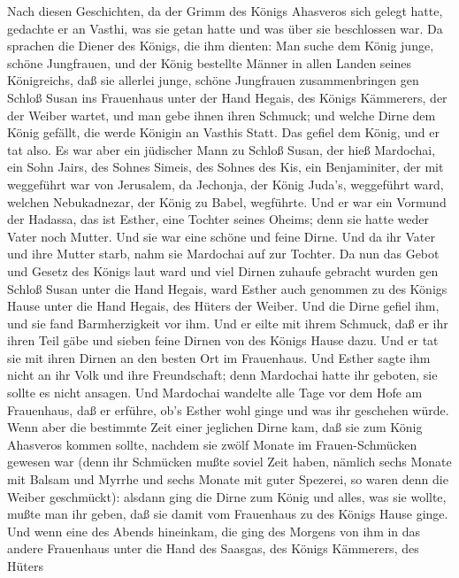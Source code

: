  Nach diesen Geschichten, da der Grimm des Königs Ahasveros
sich gelegt hatte, gedachte er an Vasthi, was sie getan hatte und was
über sie beschlossen war.  Da sprachen die Diener des
Königs, die ihm dienten: Man suche dem König junge, schöne Jungfrauen,
 und der König bestellte Männer in allen Landen seines
Königreichs, daß sie allerlei junge, schöne Jungfrauen zusammenbringen
gen Schloß Susan ins Frauenhaus unter der Hand Hegais, des Königs
Kämmerers, der der Weiber wartet, und man gebe ihnen ihren Schmuck;
 und welche Dirne dem König gefällt, die werde Königin an
Vasthis Statt. Das gefiel dem König, und er tat also.  Es
war aber ein jüdischer Mann zu Schloß Susan, der hieß Mardochai, ein
Sohn Jairs, des Sohnes Simeis, des Sohnes des Kis, ein Benjaminiter,
 der mit weggeführt war von Jerusalem, da Jechonja, der
König Juda's, weggeführt ward, welchen Nebukadnezar, der König zu Babel,
wegführte.  Und er war ein Vormund der Hadassa, das ist
Esther, eine Tochter seines Oheims; denn sie hatte weder Vater noch
Mutter. Und sie war eine schöne und feine Dirne. Und da ihr Vater und
ihre Mutter starb, nahm sie Mardochai auf zur Tochter.  Da
nun das Gebot und Gesetz des Königs laut ward und viel Dirnen zuhaufe
gebracht wurden gen Schloß Susan unter die Hand Hegais, ward Esther auch
genommen zu des Königs Hause unter die Hand Hegais, des Hüters der
Weiber.  Und die Dirne gefiel ihm, und sie fand
Barmherzigkeit vor ihm. Und er eilte mit ihrem Schmuck, daß er ihr ihren
Teil gäbe und sieben feine Dirnen von des Königs Hause dazu. Und er tat
sie mit ihren Dirnen an den besten Ort im Frauenhaus.  Und
Esther sagte ihm nicht an ihr Volk und ihre Freundschaft; denn Mardochai
hatte ihr geboten, sie sollte es nicht ansagen.  Und
Mardochai wandelte alle Tage vor dem Hofe am Frauenhaus, daß er erführe,
ob's Esther wohl ginge und was ihr geschehen würde.  Wenn
aber die bestimmte Zeit einer jeglichen Dirne kam, daß sie zum König
Ahasveros kommen sollte, nachdem sie zwölf Monate im Frauen-Schmücken
gewesen war (denn ihr Schmücken mußte soviel Zeit haben, nämlich sechs
Monate mit Balsam und Myrrhe und sechs Monate mit guter Spezerei, so
waren denn die Weiber geschmückt):  alsdann ging die Dirne
zum König und alles, was sie wollte, mußte man ihr geben, daß sie damit
vom Frauenhaus zu des Königs Hause ginge.  Und wenn eine
des Abends hineinkam, die ging des Morgens von ihm in das andere
Frauenhaus unter die Hand des Saasgas, des Königs Kämmerers, des Hüters
